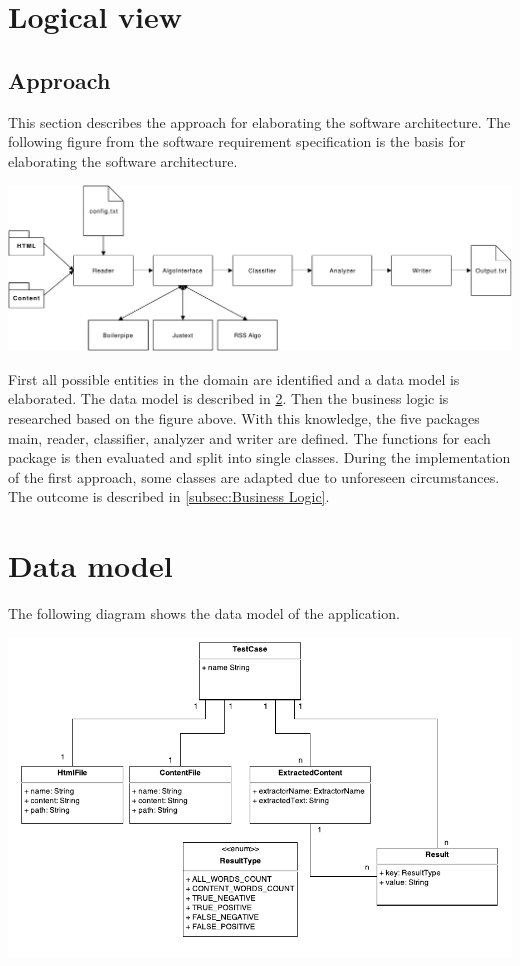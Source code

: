\section{Logical view}

\subsection{Approach}
This section describes the approach for elaborating the software architecture. 
The following figure from the software requirement specification is the basis for elaborating the software architecture.


\includegraphics[width=15cm]{Figures/App_overview.pdf}


First all possible entities in the domain are identified and a data model is elaborated. The data model is described in \ref{subsec:Data model}. Then the business logic is researched based on the figure above. With this knowledge, the five packages main, reader, classifier, analyzer and writer are defined. The functions for each package is then evaluated and split into single classes. During the implementation of the first approach, some classes are adapted due to unforeseen circumstances. The outcome is described in \ref{subsec:Business Logic}.
\pagebreak

\section{Data model}
\label{subsec:Data model}

The following diagram shows the data model of the application. 

\includegraphics[width=14cm]{Figures/dataModel.pdf}


